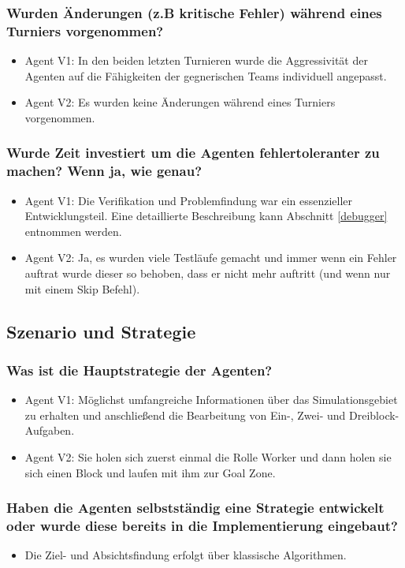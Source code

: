 \documentclass[runningheads]{llncs}
\begin{document}
\subsubsection{Wurden Änderungen (z.B kritische Fehler) während eines Turniers vorgenommen?}
\begin{itemize}
\item Agent V1: In den beiden letzten Turnieren wurde die Aggressivität der Agenten auf die Fähigkeiten der gegnerischen Teams individuell angepasst.
\item Agent V2: Es wurden keine Änderungen während eines Turniers vorgenommen.
\end{itemize}

\subsubsection{Wurde Zeit investiert um die Agenten fehlertoleranter zu machen? Wenn ja, wie genau?}
\begin{itemize}
\item Agent V1: Die Verifikation und Problemfindung war ein essenzieller Entwicklungsteil. Eine detaillierte Beschreibung kann Abschnitt \ref{debugger} entnommen werden.
\item Agent V2: Ja, es wurden viele Testläufe gemacht und immer wenn ein Fehler auftrat wurde dieser so behoben, dass er nicht mehr auftritt (und wenn nur mit einem Skip Befehl).
\end{itemize}

\subsection{Szenario und Strategie}
\subsubsection{Was ist die Hauptstrategie der Agenten?}
\begin{itemize}
\item Agent V1: Möglichst umfangreiche Informationen über das Simulationsgebiet zu erhalten und anschließend die Bearbeitung von Ein-, Zwei- und Dreiblock-Aufgaben.
\item Agent V2: Sie holen sich zuerst einmal die Rolle Worker und dann holen sie sich einen Block und laufen mit ihm zur Goal Zone.
\end{itemize}

\subsubsection{Haben die Agenten selbstständig eine Strategie entwickelt oder wurde diese bereits in die Implementierung eingebaut?}
\begin{itemize}
\item Die Ziel- und Absichtsfindung erfolgt über klassische Algorithmen.
\end{itemize}
\end{document}
